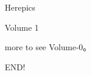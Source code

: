 \documentclass[a4paper,12pt,UTF8]{book}
\begin{document}
\author{dosconio}
\begin{center}
	\sc\fontsize{48pt}{0}\selectfont\textcolor[rgb]{1, 0.381924, 0.618}{Herepics}
\end{center}

{\hfill\sc\fontsize{24pt}{0}\selectfont\textcolor[rgb]{1, 0.381924, 0.618}{Volume 1}}

\newpage %
\renewcommand{\contentsname}{Contents}
\tableofcontents


more to see Volume-0。




\newpage

\nocite{*}
END!
\end{document}
